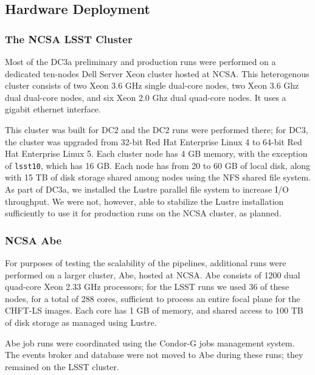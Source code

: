 \subsection{Hardware Deployment}

\subsubsection{The NCSA LSST Cluster}

Most of the DC3a preliminary and production runs were performed on a dedicated 
ten-nodes Dell Server Xeon cluster hosted at NCSA. This heterogenous cluster 
consists of two Xeon 3.6 GHz single dual-core nodes, two Xeon 3.6 Ghz dual
dual-core nodes, and six Xeon 2.0 Ghz dual quad-core nodes. It uses a
gigabit ethernet interface.

This cluster was built for DC2 and the DC2 runs were performed there; for DC3, 
the cluster was upgraded from 32-bit Red Hat Enterprise Linux 4 to 64-bit
Red Hat Enterprise Linux 5. Each cluster node has 4 GB memory, with the exception
of \texttt{lsst10}, which has 16 GB. Each node has from 20 to 60 GB of local disk,
along with 15 TB of disk storage shared among nodes using the NFS shared file system.
As part of DC3a, we installed the Lustre parallel file system to increase I/O 
throughput. We were not, however, able to stabilize the Lustre installation
sufficiently to use it for production runs on the NCSA cluster, as planned.

\subsubsection{NCSA Abe}

For purposes of testing the scalability of the pipelines, additional runs were
performed on a larger cluster, Abe, hosted at NCSA. Abe consists of 1200
dual quad-core Xeon 2.33 GHz processors; for the LSST runs we used 36 of these 
nodes, for a total of 288 cores, sufficient to process an entire focal plane 
for the CHFT-LS images. Each core has 1 GB of memory, and shared access
to 100 TB of disk storage as managed using Lustre.

Abe job runs were coordinated using the Condor-G jobs management system.
The events broker and database were not moved to Abe during these runs;
they remained on the LSST cluster.
